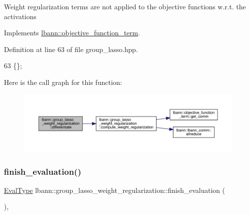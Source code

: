 Weight regularization terms are not applied to the objective functions w.\+r.\+t. the activations 

Implements \hyperlink{classlbann_1_1objective__function__term_ad009c3cfbe1cf2fbb6cce015b16fdac5}{lbann\+::objective\+\_\+function\+\_\+term}.



Definition at line 63 of file group\+\_\+lasso.\+hpp.


\begin{DoxyCode}
63 \{\};
\end{DoxyCode}
Here is the call graph for this function\+:\nopagebreak
\begin{figure}[H]
\begin{center}
\leavevmode
\includegraphics[width=350pt]{classlbann_1_1group__lasso__weight__regularization_a9d5843ebd2c3a1f77013c7b2bebb7a69_cgraph}
\end{center}
\end{figure}
\mbox{\label{classlbann_1_1group__lasso__weight__regularization_a48c46b2e06337e1890b12811182db11b}} 
\subsubsection{\texorpdfstring{finish\+\_\+evaluation()}{finish\_evaluation()}}
{\footnotesize\ttfamily \hyperlink{base_8hpp_a3266f5ac18504bbadea983c109566867}{Eval\+Type} lbann\+::group\+\_\+lasso\+\_\+weight\+\_\+regularization\+::finish\+\_\+evaluation (\begin{DoxyParamCaption}{ }\end{DoxyParamCaption})\hspace{0.3cm}{\ttfamily [override]}, {\ttfamily [virtual]}}

